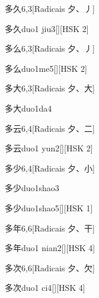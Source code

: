 \begin{entry}{多久}{6,3}[Radicais ⼣、⼃]
  \begin{phonetics}{多久}{duo1 jiu3}[][HSK 2]
  \end{phonetics}
\end{entry}

\begin{entry}{多么}{6,3}[Radicais ⼣、⼃]
  \begin{phonetics}{多么}{duo1me5}[][HSK 2]
  \end{phonetics}
\end{entry}

\begin{entry}{多大}{6,3}[Radicais ⼣、⼤]
  \begin{phonetics}{多大}{duo1da4}
  \end{phonetics}
\end{entry}

\begin{entry}{多云}{6,4}[Radicais ⼣、⼆]
  \begin{phonetics}{多云}{duo1 yun2}[][HSK 2]
  \end{phonetics}
\end{entry}

\begin{entry}{多少}{6,4}[Radicais ⼣、⼩]
  \begin{phonetics}{多少}{duo1shao3}
  \end{phonetics}
  \begin{phonetics}{多少}{duo1shao5}[][HSK 1]
  \end{phonetics}
\end{entry}

\begin{entry}{多年}{6,6}[Radicais ⼣、⼲]
  \begin{phonetics}{多年}{duo1 nian2}[][HSK 4]
  \end{phonetics}
\end{entry}

\begin{entry}{多次}{6,6}[Radicais ⼣、⽋]
  \begin{phonetics}{多次}{duo1 ci4}[][HSK 4]
  \end{phonetics}
\end{entry}

